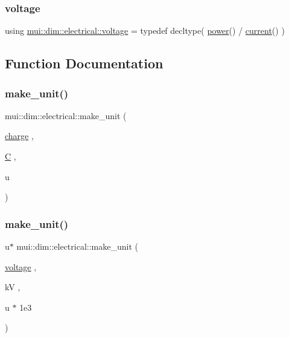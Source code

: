 \subsubsection{\texorpdfstring{voltage}{voltage}}
{\footnotesize\ttfamily using \hyperlink{namespacemui_1_1dim_1_1electrical_a028fd928ac1e20226332a4e793bac739}{mui\+::dim\+::electrical\+::voltage} = typedef decltype( \hyperlink{namespacemui_1_1dim_a055b2b3b59399dc93eeb974aef05b85b}{power}() / \hyperlink{namespacemui_1_1dim_ac15a72100f3e57d6c9419fca5501b456}{current}() )}



\subsection{Function Documentation}
\mbox{\label{namespacemui_1_1dim_1_1electrical_ac636ae6cfce6a3b0764e2a092894c587}} 
\subsubsection{\texorpdfstring{make\+\_\+unit()}{make\_unit()}\hspace{0.1cm}{\footnotesize\ttfamily [1/7]}}
{\footnotesize\ttfamily mui\+::dim\+::electrical\+::make\+\_\+unit (\begin{DoxyParamCaption}\item[{\hyperlink{namespacemui_1_1dim_1_1electrical_acd4b8cce75196ce05ff2879941d870df}{charge}}]{,  }\item[{\hyperlink{namespacemui_1_1dim_a819cc406ce7c3b35bd3bbd6724ff8d42}{C}}]{,  }\item[{u}]{ }\end{DoxyParamCaption})}

\mbox{\label{namespacemui_1_1dim_1_1electrical_a9f531023bc12ae2ed2b2abc706fc49e0}} 
\subsubsection{\texorpdfstring{make\+\_\+unit()}{make\_unit()}\hspace{0.1cm}{\footnotesize\ttfamily [2/7]}}
{\footnotesize\ttfamily u$\ast$ mui\+::dim\+::electrical\+::make\+\_\+unit (\begin{DoxyParamCaption}\item[{\hyperlink{namespacemui_1_1dim_1_1electrical_a028fd928ac1e20226332a4e793bac739}{voltage}}]{,  }\item[{kV}]{,  }\item[{u $\ast$}]{1e3 }\end{DoxyParamCaption})}

